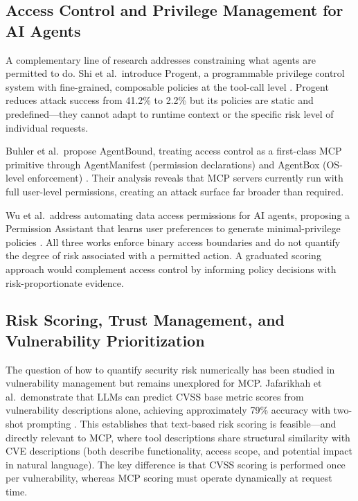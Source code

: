 \documentclass[12pt]{article}
\begin{document}
\subsection{Access Control and Privilege Management for AI Agents}

A complementary line of research addresses constraining what agents are permitted to do. Shi et al.\ introduce Progent, a programmable privilege control system with fine-grained, composable policies at the tool-call level \cite{shi2025progent}. Progent reduces attack success from 41.2\% to 2.2\% but its policies are static and predefined---they cannot adapt to runtime context or the specific risk level of individual requests.

Buhler et al.\ propose AgentBound, treating access control as a first-class MCP primitive through AgentManifest (permission declarations) and AgentBox (OS-level enforcement) \cite{buhler2025agentbound}. Their analysis reveals that MCP servers currently run with full user-level permissions, creating an attack surface far broader than required.

Wu et al.\ address automating data access permissions for AI agents, proposing a Permission Assistant that learns user preferences to generate minimal-privilege policies \cite{wu2025automating_data_access}. All three works enforce binary access boundaries and do not quantify the degree of risk associated with a permitted action. A graduated scoring approach would complement access control by informing policy decisions with risk-proportionate evidence.

\subsection{Risk Scoring, Trust Management, and Vulnerability Prioritization}

The question of how to quantify security risk numerically has been studied in vulnerability management but remains unexplored for MCP. Jafarikhah et al.\ demonstrate that LLMs can predict CVSS base metric scores from vulnerability descriptions alone, achieving approximately 79\% accuracy with two-shot prompting \cite{jafarikhah2026description_to_score}. This establishes that text-based risk scoring is feasible---and directly relevant to MCP, where tool descriptions share structural similarity with CVE descriptions (both describe functionality, access scope, and potential impact in natural language). The key difference is that CVSS scoring is performed once per vulnerability, whereas MCP scoring must operate dynamically at request time.
\end{document}
